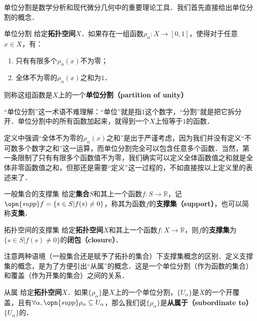 

单位分割是数学分析和现代微分几何中的重要理论工具．我们首先直接给出单位分割的概念．

\begin{definition}{单位分割}
给定\textbf{拓扑空间}$X$．如果存在一组函数$\rho_\alpha: X \to [0, 1]$，使得对于任意$x\in X$，有：
\begin{enumerate}
\item 只有有限多个$\rho_\alpha(x)$不为零；
\item 全体不为零的$\rho_\alpha(x)$之和为$1$．
\end{enumerate}
则称这组函数是$X$上的一个\textbf{单位分割（partition of unity）}
\end{definition}

“单位分割”这一术语不难理解：“单位”就是指$1$这个数字，“分割”就是把它拆分开．单位分割中的所有函数加起来，就得到一个$X$上恒等于$1$的函数．

定义中强调“全体不为零的$\rho_\alpha(x)$之和”是出于严谨考虑，因为我们并没有定义“不可数多个数字之和”这一运算，而单位分割完全可以包含任意多个函数．当然，第一条限制了只有有限多个函数值不为零，我们确实可以定义全体函数值之和就是全体非零函数值之和，但那还是需要“定义”这一过程的，不如直接按以上定义里的表述来了．

\begin{definition}{一般集合的支撑集}
给定\textbf{集合}$S$和其上一个函数$f:S\to\mathbb{R}$，记$\opn{supp} f = \{s\in S| f(s)\not=0\}$，称其为函数$f$的\textbf{支撑集（support）}，也可以简称\textbf{支集}．
\end{definition}

\begin{definition}{拓扑空间的支撑集}
给定\textbf{拓扑空间}$X$和其上一个函数$f:X\to\mathbb{R}$，则$f$的\textbf{支撑集}为$\{s\in S| f(s)\not=0\}$的\textbf{闭包（closure）}．
\end{definition}

注意两种语境（一般集合还是赋予了拓扑的集合）下支撑集概念的区别．定义支撑集的概念，是为了方便引出“从属”的概念．这是一个单位分割（作为函数的集合）和覆盖（作为开集的集合）之间的关系．

\begin{definition}{从属}
给定\textbf{拓扑空间}$X$．如果$\{\rho_\alpha\}$是$X$上的一个单位分割，$\{U_\alpha\}$是$X$的一个开覆盖，且有$\forall \alpha, \opn{supp}\rho_\alpha\subseteq U_\alpha$，那么我们说$\{\rho_\alpha\}$是\textbf{从属于（subordinate to）}$\{U_\alpha\}$的．
\end{definition}

